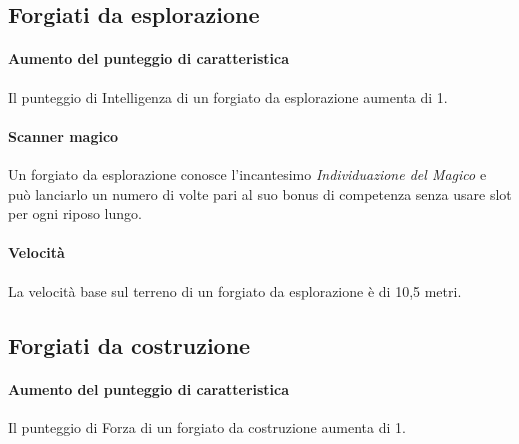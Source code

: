 \subsection{Forgiati da esplorazione}
\paragraph{Aumento del punteggio di caratteristica} Il punteggio di Intelligenza di un forgiato da esplorazione aumenta di 1.
\paragraph{Scanner magico} Un forgiato da esplorazione conosce l'incantesimo \textit{Individuazione del Magico} e può lanciarlo un numero di volte pari al suo bonus di competenza senza usare slot per ogni riposo lungo.
\paragraph{Velocità} La velocità base sul terreno di un forgiato da esplorazione è di 10,5 metri.

\subsection{Forgiati da costruzione}
\paragraph{Aumento del punteggio di caratteristica} Il punteggio di Forza di un forgiato da costruzione aumenta di 1.